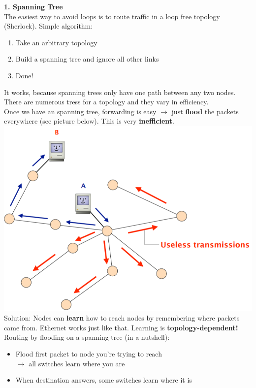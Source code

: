 \documentclass[a4paper, fontsize=8pt, landscape, DIV=1]{scrartcl}
\begin{document}
\begin{multicols*}{4}
			\textbf{1. Spanning Tree}\\
			The easiest way to avoid loops is to route traffic in a loop free topology (Sherlock). Simple algorithm: 
			\begin{enumerate}[noitemsep]
				\item Take an arbitrary topology
				\item Build a spanning tree and ignore all other links
				\item Done!
			\end{enumerate}
			It works, because spanning trees only have one path between any two nodes. There are numerous tress for a topology and they vary in efficiency. \\
			Once we have an spanning tree, forwarding is easy $\rightarrow$ just \textbf{flood} the packets everywhere (see picture below). This is very \textbf{inefficient}. 
			\includegraphics[width=\columnwidth]{images/Concepts/flooding_1.png}
			Solution: Nodes can \textbf{learn} how to reach nodes by remembering where packets came from. Ethernet works just like that. Learning is \textbf{topology-dependent!}\\
			Routing by flooding on a spanning tree (in a nutshell):
			\begin{itemize}[noitemsep]
				\item Flood first packet to node you're trying to reach\\ $\rightarrow$ all switches learn where you are
				\item When destination answers, some switches learn where it is\\

\end{itemize}
\end{multicols*}
\end{document}
